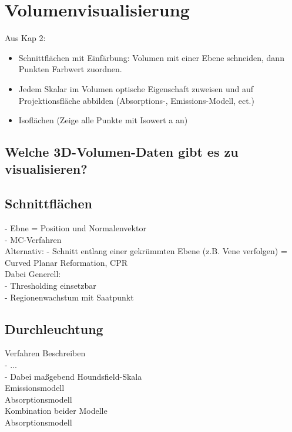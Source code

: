 \documentclass{article}
\begin{document}
\pagebreak
\section{Volumenvisualisierung}
Aus Kap 2:
\begin{itemize}[noitemsep]
	\item Schnittflächen mit Einfärbung: Volumen mit einer Ebene schneiden, dann Punkten Farbwert zuordnen.
	\item Jedem Skalar im Volumen optische Eigenschaft zuweisen und auf Projektionsfläche abbilden (Absorptions-, Emissions-Modell, ect.)
	\item Isoflächen (Zeige alle Punkte mit Isowert a an)
\end{itemize}


\subsection{Welche 3D-Volumen-Daten gibt es zu visualisieren?}


\subsection{Schnittflächen}
- Ebne = Position und Normalenvektor\\
- MC-Verfahren\\

\noindent Alternativ: 
- Schnitt entlang einer gekrümmten Ebene (z.B. Vene verfolgen) = Curved Planar Reformation, CPR\\

\noindent Dabei Generell:\\
- Thresholding einsetzbar\\
- Regionenwachstum mit Saatpunkt


\subsection{Durchleuchtung}
Verfahren Beschreiben\\
- ...\\
- Dabei maßgebend Houndsfield-Skala\\

\noindent Emissionsmodell\\

\noindent Absorptionsmodell\\

\noindent Kombination beider Modelle\\

\noindent Absorptionsmodell\\
\end{document}
